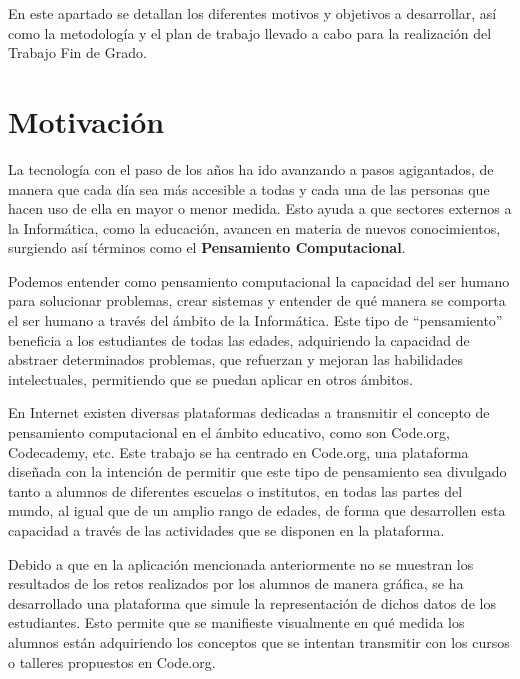 
En este apartado se detallan los diferentes motivos y objetivos a desarrollar, así como la metodología y el plan de trabajo llevado a cabo para la realización del Trabajo Fin de Grado.

\section{Motivación}
\label{1:sec:1}

La tecnología con el paso de los años ha ido avanzando a pasos agigantados, de manera que cada día sea más accesible a todas y cada una de las personas que hacen uso de ella en mayor o menor medida. Esto ayuda a que sectores externos a la Informática, como la educación, avancen en materia de nuevos conocimientos,
surgiendo así términos como el \textbf{Pensamiento Computacional}.

Podemos entender como pensamiento computacional la capacidad del ser humano para solucionar problemas, crear sistemas y entender de qué manera se comporta el ser humano a través del ámbito de la Informática. Este tipo de ``pensamiento'' beneficia a los estudiantes de todas las edades, adquiriendo la capacidad de abstraer determinados
problemas, que refuerzan y mejoran las habilidades intelectuales, permitiendo que se puedan aplicar en otros ámbitos.

En Internet existen diversas plataformas dedicadas a transmitir el concepto de pensamiento computacional en el ámbito educativo, como son Code.org\cite{Code.org}, Codecademy\cite{Codecademy}, etc. Este trabajo se ha centrado en Code.org, una plataforma diseñada con la intención de permitir que este tipo de pensamiento sea divulgado tanto a alumnos de diferentes
escuelas o institutos, en todas las partes del mundo, al igual que de un amplio rango de edades, de forma que desarrollen esta capacidad a través de las actividades que se disponen en la plataforma.

Debido a que en la aplicación mencionada anteriormente no se muestran los resultados de los retos realizados por los alumnos de manera gráfica, se ha desarrollado una plataforma que simule la representación de dichos datos de los estudiantes. Esto permite que se manifieste visualmente en qué medida los alumnos están adquiriendo los conceptos
que se intentan transmitir con los cursos o talleres propuestos en Code.org. 

